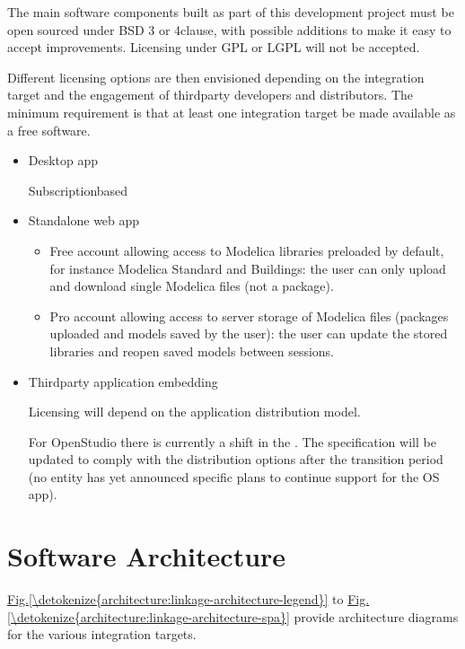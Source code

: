 \documentclass[letterpaper,10pt, openany,english]{sphinxmanual}
\begin{document}
The main software components built as part of this development project must be open sourced under BSD 3 or 4\sphinxhyphen{}clause, with possible additions to make it easy to accept improvements. Licensing under GPL or LGPL will not be accepted.

Different licensing options are then envisioned depending on the integration target and the engagement of third\sphinxhyphen{}party developers and distributors. The minimum requirement is that at least one integration target be made available as a free software.
\begin{itemize}
\item {} 
Desktop app

Subscription\sphinxhyphen{}based

\item {} 
Standalone web app
\begin{itemize}
\item {} 
Free account allowing access to Modelica libraries preloaded by default, for instance Modelica Standard and Buildings: the user can only upload and download single Modelica files (not a package).

\item {} 
Pro account allowing access to server storage of Modelica files (packages uploaded and models saved by the user): the user can update the stored libraries and reopen saved models between sessions.

\end{itemize}

\item {} 
Third\sphinxhyphen{}party application embedding

Licensing will depend on the application distribution model.

For OpenStudio there is currently a shift in the . The specification will be updated to comply with the distribution options after the transition period (no entity has yet announced specific plans to continue support for the OS app).

\end{itemize}


\chapter{Software Architecture}
\label{\detokenize{architecture:software-architecture}}\label{\detokenize{architecture:sec-architecture}}\label{\detokenize{architecture::doc}}
\hyperref[\detokenize{architecture:linkage-architecture-legend}]{Fig.\@ \ref{\detokenize{architecture:linkage-architecture-legend}}} to \hyperref[\detokenize{architecture:linkage-architecture-spa}]{Fig.\@ \ref{\detokenize{architecture:linkage-architecture-spa}}} provide architecture diagrams for the various integration targets.
\end{document}
